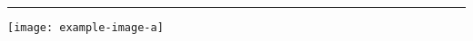 \documentclass[a4paper]{article}
\begin{document}
    \leavevmode
    \rule{1pt}{200pt}


    \texttt{[image: example-image-a]}
\end{document}
